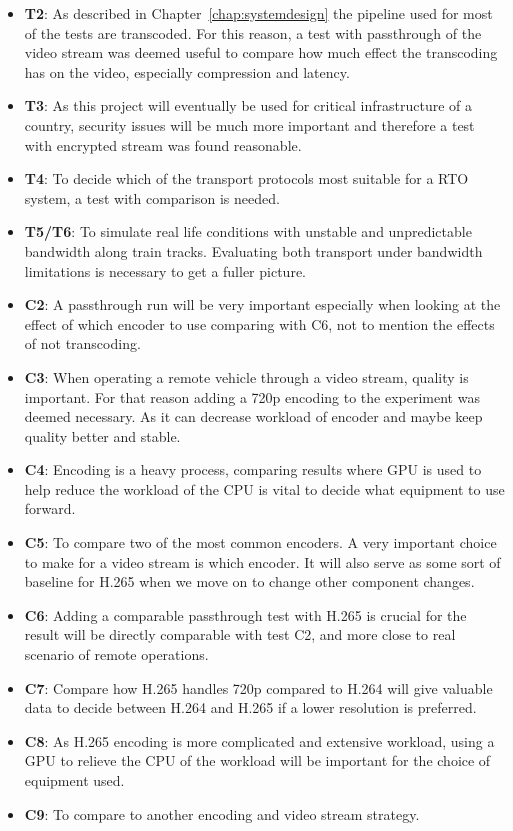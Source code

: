 \begin{itemize}
    \item \textbf{T2}: As described in Chapter~\ref{chap:systemdesign} the pipeline used for most of the tests are transcoded. For this reason, a test with passthrough of the video stream was deemed useful to compare how much effect the transcoding has on the video, especially compression and latency. 
    \item \textbf{T3}: As this project will eventually be used for critical infrastructure of a country, security issues will be much more important and therefore a test with encrypted stream was found reasonable.
    \item \textbf{T4}: To decide which of the transport protocols most suitable for a RTO system, a test with comparison is needed.
    \item \textbf{T5/T6}: To simulate real life conditions with unstable and unpredictable bandwidth along train tracks. Evaluating both transport under bandwidth limitations is necessary to get a fuller picture.
\end{itemize}



\begin{itemize}
    \item \textbf{C2}: A passthrough run will be very important especially when looking at the effect of which encoder to use comparing with C6, not to mention the effects of not transcoding. 
    \item \textbf{C3}: When operating a remote vehicle through a video stream, quality is important. For that reason adding a 720p encoding to the experiment was deemed necessary. As it can decrease workload of encoder and maybe keep quality better and stable.
    \item \textbf{C4}: Encoding is a heavy process, comparing results where GPU is used to help reduce the workload of the CPU is vital to decide what equipment to use forward.
    \item \textbf{C5}: To compare two of the most common encoders. A very important choice to make for a video stream is which encoder. It will also serve as some sort of baseline for H.265 when we move on to change other component changes.
    \item \textbf{C6}: Adding a comparable passthrough test with H.265 is crucial for the result will be directly comparable with test C2, and more close to real scenario of remote operations.
    \item \textbf{C7}: Compare how H.265 handles 720p compared to H.264 will give valuable data to decide between H.264 and H.265 if a lower resolution is preferred. 
    \item \textbf{C8}: As H.265 encoding is more complicated and extensive workload, using a GPU to relieve the CPU of the workload will be important for the choice of equipment used.
    \item \textbf{C9}: To compare to another encoding and video stream strategy. 
\end{itemize}
 
